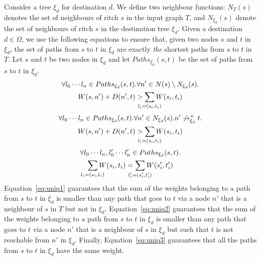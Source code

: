 Consider a tree $\xi_d$ for destination $d$. We define two neighbour
functions: $N_T(s)$ denotes the set of neighbours of ritch $s$ 
in the input graph $T$, and $N_{\xi_d}(s)$ denote the set of
neighbours of ritch $s$ in the destination tree $\xi_d$. 
Given a destination $d\in \Omega$,
we use the following equations to ensure that, given two nodes $s$ and $t$ in
$\xi_d$, 
the set of paths from $s$ to $t$ in $\xi_d$ are
exactly
\emph{the} shortest paths from $s$ to $t$ in $T$.
Let $s$ and $t$ be two nodes in $\xi_d$ and let  $Paths_{\xi_d}(s,t)$ be the set of paths from $s$ to $t$ in $\xi_d$.
\begin{multline} \label{eq:uniq1}
		\forall l_0\cdots l_n\in Paths_{\xi_d}(s,t).
		\forall n' \in N(s) \setminus N_{\xi_d}(s). \\
		W(s, n') + D(n', t) > \sum_{\mathclap{\substack{l_i=(s_i,t_i)}}} 
		W(s_i, t_i) 
\end{multline}
\begin{multline} \label{eq:uniq2}
		\forall l_0\cdots l_n\in Paths_{\xi_d}(s,t).
		\forall n' \in N_{\xi_d}(s). n' \not\rightarrow^+_{\xi_d} t.  \\
		W(s, n') + D(n', t) > \sum_{\mathclap{\substack{l_i=(s_i,t_i)}}} 
		W(s_i, t_i) 
\end{multline}
\vspace{-2mm}
\begin{multline} \label{eq:uniq3}
		\forall l_0\cdots l_n, l_0'\cdots l_n'\in Paths_{\xi_d}(s,t).\\
		\sum_{\mathclap{\substack{l_i=(s_i,t_i)}}} 
		W(s_i, t_i)  =\sum_{\mathclap{\substack{l_i'=(s_i',t_i')}}} 
		W(s_i', t_i') 
\end{multline}
Equation~\ref{eq:uniq1} guarantees that 
the sum of the weights belonging to a path from $s$ to $t$ in $\xi_d$ is smaller than 
any path that goes to $t$ via a node $n'$ that is a neighbour of $s$ in $T$ but not in $\xi_d$.
Equation~\ref{eq:uniq2} guarantees that
the sum of the weights belonging to a path from $s$ to $t$ in $\xi_d$ is smaller than 
any path that goes to $t$ via a node $n'$ that is a neighbour of $s$ in $\xi_d$ but such that
$t$ is not reachable from $n'$ in $\xi_d$.
Finally, Equation~\ref{eq:uniq3} guarantees that all the paths from $s$ to $t$ in $\xi_d$ have the same weight.
